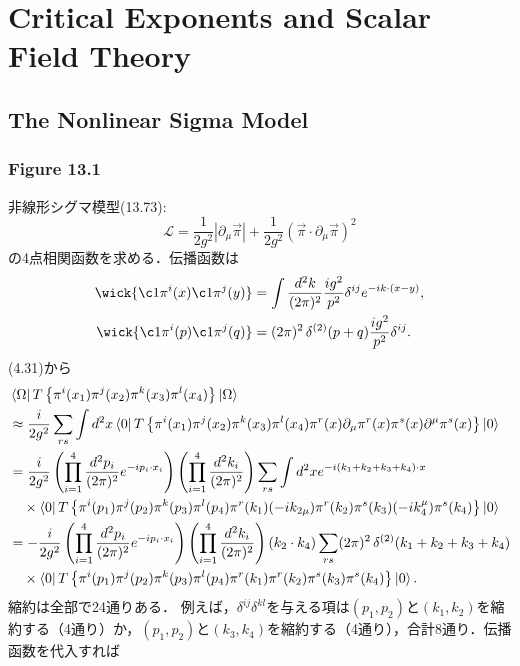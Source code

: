 \chapter{Critical Exponents and Scalar Field Theory}
\setcounter{section}{2}
\section{The Nonlinear Sigma Model}
\subsection{Figure 13.1}
非線形シグマ模型(13.73):
\[
\mathcal{L} = \frac{1}{2g^2} \left\lvert \partial_\mu \vec\pi \right\rvert
+ \frac{1}{2g^2} \left( \vec\pi \cdot \partial_\mu \vec\pi \right)^2
\]
の4点相関函数を求める．伝播函数は
\begin{align*}
  \wick{\c1{\pi}^i(x) \c1{\pi}^j(y)} &= \int \frac{d^2k}{(2\pi)^2} \frac{ig^2}{p^2} \delta^{ij} e^{-ik \cdot (x-y)},  \\
  \wick{\c1{\pi}^i(p) \c1{\pi}^j(q)} &= (2\pi)^2 \mathop{\delta^{(2)}}(p+q) \frac{ig^2}{p^2} \delta^{ij} .
\end{align*}
(4.31)から
\begin{align*}
  &\bra\Omega T \left\{ \pi^i(x_1) \pi^j(x_2) \pi^k(x_3) \pi^l(x_4) \right\} \ket\Omega \\
  &\approx \frac{i}{2g^2} \sum_{rs} \int d^2x
  \bra{0} T \left\{ \pi^i(x_1) \pi^j(x_2) \pi^k(x_3) \pi^l(x_4) \pi^r(x) \partial_\mu \pi^r(x) \pi^s(x) \partial^\mu \pi^s(x) \right\} \ket{0} \\
  &= \frac{i}{2g^2} \left( \prod_{i=1}^4 \frac{d^2p_i}{(2\pi)^2} e^{-i p_i \cdot x_i} \right)
  \left( \prod_{i=1}^4 \frac{d^2k_i}{(2\pi)^2} \right)
  \sum_{rs} \int d^2x e^{-i (k_1 + k_2 + k_3 + k_4) \cdot x} \\
  & \quad\times \bra{0} T \left\{ \pi^i(p_1) \pi^j(p_2) \pi^k(p_3) \pi^l(p_4)
  \pi^r(k_1) (-ik_{2\mu}) \pi^r(k_2) \pi^s(k_3) (-ik_4^\mu) \pi^s(k_4) \right\} \ket{0} \\
  &= - \frac{i}{2g^2} \left( \prod_{i=1}^4 \frac{d^2p_i}{(2\pi)^2} e^{-i p_i \cdot x_i} \right)
  \left( \prod_{i=1}^4 \frac{d^2k_i}{(2\pi)^2} \right) (k_2 \cdot k_4)
  \sum_{rs} (2\pi)^2 \mathop{\delta^{(2)}}(k_1 + k_2 + k_3 + k_4) \\
  & \quad\times \bra{0} T \left\{ \pi^i(p_1) \pi^j(p_2) \pi^k(p_3) \pi^l(p_4)
  \pi^r(k_1) \pi^r(k_2) \pi^s(k_3) \pi^s(k_4) \right\} \ket{0} .
\end{align*}
縮約は全部で24通りある．
例えば，$\delta^{ij} \delta^{kl}$を与える項は$(p_1, p_2)$と$(k_1, k_2)$を縮約する（4通り）か，$(p_1, p_2)$と$(k_3, k_4)$を縮約する（4通り），合計8通り．伝播函数を代入すれば
